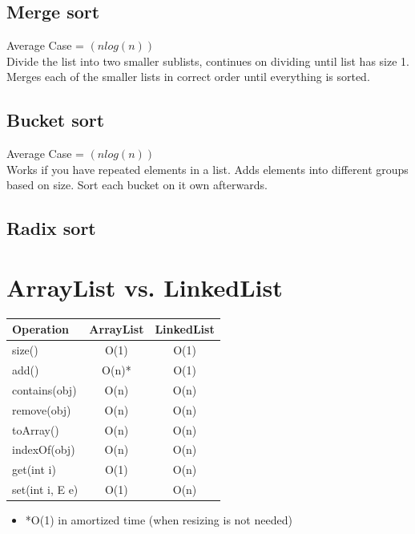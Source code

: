 \documentclass{article}
\begin{document}
\subsection{Merge sort}
Average Case = $(nlog(n))$\\
Divide the list into two smaller sublists, continues on dividing until list has size 1. Merges each of the smaller lists in correct order until everything is sorted. 
\subsection{Bucket sort}
Average Case = $(nlog(n))$\\
Works if you have repeated elements in a list. Adds elements into different groups based on size. Sort each bucket on it own afterwards. 

\subsection{Radix sort}


\newpage

\section{ArrayList vs. LinkedList}
\begin{table}[!ht]
\centering
\begin{tabular}{|l|c|c|}
\hline
\textbf{Operation} & \textbf{ArrayList} & \textbf{LinkedList} \\
\hline
size() & O(1) & O(1) \\
\hline
add() & O(n)* & O(1) \\
\hline
contains(obj) & O(n) & O(n) \\
\hline
remove(obj) & O(n) & O(n) \\
\hline
toArray() & O(n) & O(n) \\
\hline
indexOf(obj) & O(n) & O(n) \\
\hline
get(int i) & O(1) & O(n) \\
\hline
set(int i, E e) & O(1) & O(n) \\
\hline
\end{tabular}
\end{table}
\begin{itemize}
  \item *O(1) in amortized time (when resizing is not needed)
\end{itemize}
\end{document}

